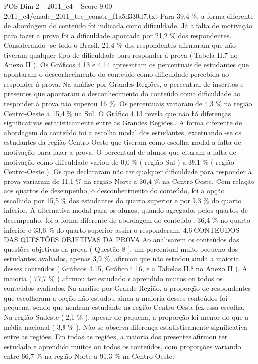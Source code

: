 \begin{textsample}{POS Dim 2 – 2011\_c4 – Score 9.00 – 2011\_c4/enade\_2011\_tec\_constr\_f1a5d330d7.txt}
Para 39,4 \%, a forma diferente de abordagem do conteúdo foi indicada como dificuldade.
Já a falta de motivação para fazer a prova foi a dificuldade apontada por 21,2 \% dos respondentes.
Considerando -se todo o Brasil, 21,4 \% dos respondentes afirmaram que não tiveram qualquer tipo de dificuldade para responder à prova ( Tabela II.7 no Anexo II ).
Os Gráficos 4.13 e 4.14 apresentam os percentuais de estudantes que apontaram o desconhecimento do conteúdo como dificuldade percebida ao responder à prova.
Na análise por Grandes Regiões, o percentual de inscritos e presentes que apontaram o desconhecimento do conteúdo como dificuldade ao responder à prova não superou 16 \%.
Os percentuais variaram de 4,3 \% na região Centro-Oeste a 15,4 \% na Sul.
O Gráfico 4.13 revela que não há diferenças significativas estatisticamente entre as Grandes Regiões..
A forma diferente de abordagem do conteúdo foi a escolha modal dos estudantes, excetuando -se os estudantes da região Centro-Oeste que tiveram como escolha modal a falta de motivação para fazer a prova.
O percentual de alunos que citaram a falta de motivação como dificuldade variou de 0,0 \% ( região Sul ) a 39,1 \% ( região Centro-Oeste ).
Os que declararam não ter qualquer dificuldade para responder à prova variaram de 11,1 \% na região Norte a 30,4 \% na Centro-Oeste.
Com relação aos quartos de desempenho, o desconhecimento do conteúdo, foi a opção escolhida por 15,5 \% dos estudantes do quarto superior e por 9,3 \% do quarto inferior.
A alternativa modal para os alunos, quando agregados pelos quartos de desempenho, foi a forma diferente de abordagem do conteúdo : 36,4 \% no quarto inferior e 33,6 \% do quarto superior assim o responderam. 4.6 CONTEÚDOS DAS QUESTÕES OBJETIVAS DA PROVA Ao analisarem os conteúdos das questões objetivas da prova ( Questão 8 ), um percentual muito pequeno dos estudantes avaliados, apenas 3,9 \%, afirmou que não estudou ainda a maioria desses conteúdos ( Gráficos 4.15, Gráfico 4.16, e a Tabelas II.8 no Anexo II ).
A maioria ( 77,7 \% ) afirmou ter estudado e aprendido muitos ou todos os conteúdos avaliados.
Na análise por Grande Região, a proporção de respondentes que escolheram a opção não estudou ainda a maioria desses conteúdos foi pequena, sendo que nenhum estudante na região Centro-Oeste fez essa escolha.
Na região Sudeste ( 2,1 \% ), apesar de pequena, a proporção foi menor do que a média nacional ( 3,9 \% ).
Não se observa diferença estatisticamente significativa entre as regiões.
Em todas as regiões, a maioria dos presentes afirmou ter estudado e aprendido muitos ou todos os conteúdos, com proporções variando entre 66,7 \% na região Norte a 91,3 \% na Centro-Oeste.

\end{textsample}
